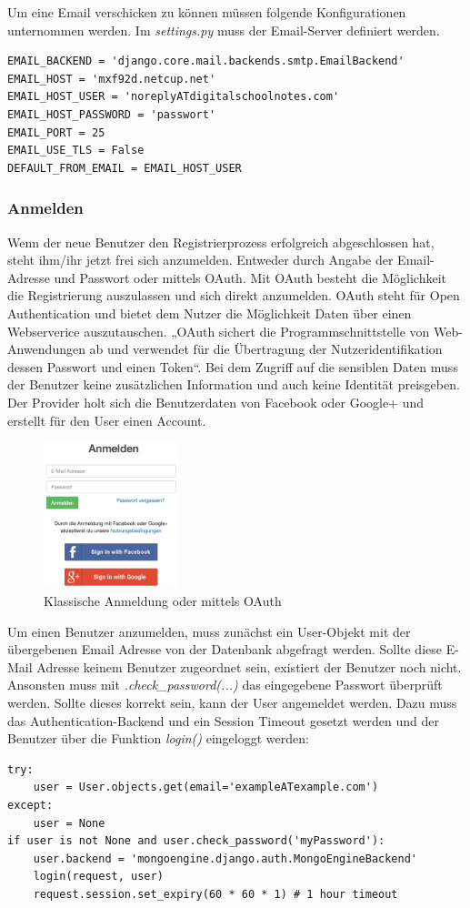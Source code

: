 Um eine Email verschicken zu können müssen folgende Konfigurationen unternommen werden. Im \textit{settings.py} muss der Email-Server definiert werden.
\begin{lstlisting}
EMAIL_BACKEND = 'django.core.mail.backends.smtp.EmailBackend'
EMAIL_HOST = 'mxf92d.netcup.net'
EMAIL_HOST_USER = 'noreplyATdigitalschoolnotes.com'
EMAIL_HOST_PASSWORD = 'passwort'
EMAIL_PORT = 25
EMAIL_USE_TLS = False
DEFAULT_FROM_EMAIL = EMAIL_HOST_USER
\end{lstlisting}

\subsubsection{Anmelden}
Wenn der neue Benutzer den Registrierprozess erfolgreich abgeschlossen hat, steht ihm/ihr jetzt frei sich anzumelden. Entweder durch Angabe der Email-Adresse und Passwort oder mittels OAuth. Mit OAuth besteht die Möglichkeit die Registrierung auszulassen und sich direkt anzumelden. OAuth steht für Open Authentication und bietet dem Nutzer die Möglichkeit Daten über einen Webserverice auszutauschen. „OAuth sichert die Programmschnittstelle von Web-Anwendungen ab und verwendet für die Übertragung der Nutzeridentifikation dessen Passwort und einen Token“\cite{OAUTH}. Bei dem Zugriff auf die sensiblen Daten muss der Benutzer keine zusätzlichen Information und auch keine Identität preisgeben. Der Provider holt sich die Benutzerdaten von Facebook oder Google+ und erstellt für den User einen Account.

\begin{figure}[ht]
\includegraphics[width=0.35\textwidth]{images/usermanagement/Anmelden}
	\caption{Klassische Anmeldung oder mittels OAuth}
	\label{fig3}
\end{figure}

Um einen Benutzer anzumelden, muss zunächst ein User-Objekt mit der übergebenen Email Adresse von der Datenbank abgefragt werden. Sollte diese E-Mail Adresse keinem Benutzer zugeordnet sein, existiert der Benutzer noch nicht. Ansonsten muss mit \textit{.check\_password(...)} das eingegebene Passwort überprüft werden. Sollte dieses korrekt sein, kann der User angemeldet werden. Dazu muss das Authentication-Backend und ein Session Timeout gesetzt werden und der Benutzer über die Funktion \textit{login()} eingeloggt werden:
\begin{lstlisting}
try:
    user = User.objects.get(email='exampleATexample.com')
except:
    user = None
if user is not None and user.check_password('myPassword'):
    user.backend = 'mongoengine.django.auth.MongoEngineBackend'
    login(request, user)
    request.session.set_expiry(60 * 60 * 1) # 1 hour timeout
\end{lstlisting}

